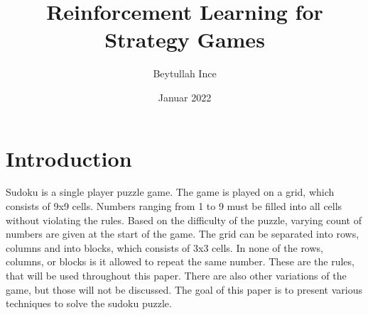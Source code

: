 \documentclass[twoside]{ausarbeitung}
\begin{document}

\author{Beytullah Ince}
\title{\textbf{Reinforcement Learning for Strategy Games}}

\date{Januar 2022}

\maketitle
\cleardoublepage

\setcounter{page}{1}

\tableofcontents

\listoffigures

\listoftables

\cleardoublepage
{}
\setcounter{page}{1}



\chapter{Introduction}
Sudoku is a single player puzzle game. The game is played on a grid, which consists of 9x9 cells. Numbers ranging from 1 to 9 must be filled into all cells without violating the rules. Based on the difficulty of the puzzle, varying count of numbers are given at the start of the game. The grid can be separated into rows, columns and into blocks, which consists of 3x3 cells. In none of the rows, columns, or blocks is it allowed to repeat the same number. These are the rules, that will be used throughout this paper. There are also other variations of the game, but those will not be discussed.
The goal of this paper is to present various techniques to solve the sudoku puzzle.

\end{document}
